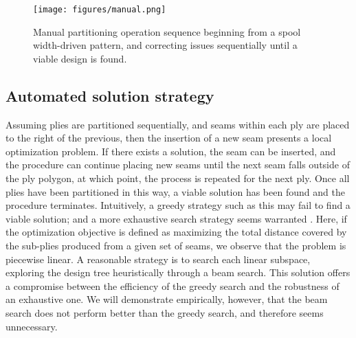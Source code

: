 \begin{figure}
    \centering
    \texttt{[image: figures/manual.png]}
    \caption{Manual partitioning operation sequence beginning from a spool width-driven pattern, and correcting issues sequentially until a viable design is found.}
    \label{fig:manual}
\end{figure}

\subsection{Automated solution strategy}
Assuming plies are partitioned sequentially, and seams within each ply are placed to the right of the previous, then the insertion of a new seam presents a local optimization problem. If there exists a solution, the seam can be inserted, and the procedure can continue placing new seams until the next seam falls outside of the ply polygon, at which point, the process is repeated for the next ply.
Once all plies have been partitioned in this way, a viable solution has been found and the procedure terminates. Intuitively, a greedy strategy such as this may fail to find a viable solution; and a more exhaustive search strategy seems warranted \cite{cormen2022introduction}. Here, if the optimization objective is defined as maximizing the total distance covered by the sub-plies produced from a given set of seams, we observe that the problem is piecewise linear. A reasonable strategy is to search each linear subspace, exploring the design tree heuristically through a beam search. This solution offers a compromise between the efficiency of the greedy search and the robustness of an exhaustive one. We will demonstrate empirically, however, that the beam search does not perform better than the greedy search, and therefore seems unnecessary.


